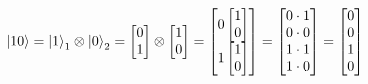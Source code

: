 \documentclass{article}
\begin{document}
\begin{equation}
    \ket{10} = \ket{1}_1 \otimes \ket{0}_2 = 
    \begin{bmatrix}
    0\\
    1
    \end{bmatrix}
    \otimes\begin{bmatrix}
    1\\
    0
    \end{bmatrix} = 
    \begin{bmatrix}
    0\begin{bmatrix}
    1\\
    0
    \end{bmatrix}\\
    1\begin{bmatrix}
    1\\
    0
    \end{bmatrix}
    \end{bmatrix} = \begin{bmatrix}
    0 \cdot 1\\
    0 \cdot 0\\
    1 \cdot 1\\
    1 \cdot 0\\
    \end{bmatrix} = \begin{bmatrix}
    0\\
    0\\
    1\\
    0\\
    \end{bmatrix}
\end{equation}
\end{document}
